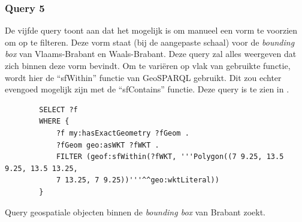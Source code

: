 \subsubsection{Query 5}
De vijfde query toont aan dat het mogelijk is om manueel een vorm te voorzien om op te filteren. Deze vorm staat (bij de aangepaste schaal) voor de \textit{bounding box} van Vlaams-Brabant en Waals-Brabant. Deze query zal alles weergeven dat zich binnen deze vorm bevindt. Om te variëren op vlak van gebruikte functie, wordt hier de ``sfWithin'' functie van GeoSPARQL gebruikt. Dit zou echter evengoed mogelijk zijn met de ``sfContains'' functie. Deze query is te zien in .

\begin{listing}[ht]
    \begin{verbatim}
        SELECT ?f
        WHERE {
            ?f my:hasExactGeometry ?fGeom .
            ?fGeom geo:asWKT ?fWKT .
            FILTER (geof:sfWithin(?fWKT, '''Polygon((7 9.25, 13.5 9.25, 13.5 13.25, 
            7 13.25, 7 9.25))'''^^geo:wktLiteral))
        }
    \end{verbatim}
    \caption{Query geospatiale objecten binnen de \textit{bounding box} van Brabant zoekt.}
    \label{listing:find_everything_bounding_box}
\end{listing}